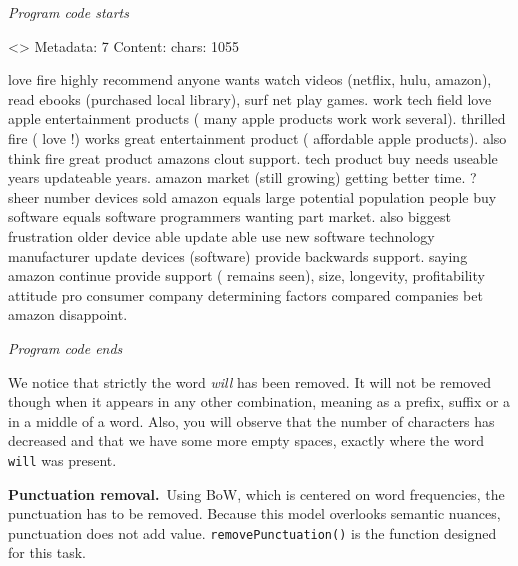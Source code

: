 \emph{Program code starts}

\begin{Shaded}
\begin{Highlighting}[]
\OtherTok{\textless{}{-}} \NormalTok{(}\NormalTok{))}

\NormalTok{(docs[[}\NormalTok{]])}
\end{Highlighting}
\end{Shaded}

\textless{}\textgreater{} Metadata: 7 Content: chars: 1055

love fire highly recommend anyone wants watch videos (netflix, hulu,
amazon), read ebooks (purchased local library), surf net play games.
work tech field love apple entertainment products ( many apple products
work work several). thrilled fire ( love !) works great entertainment
product ( affordable apple products). also think fire great product
amazons clout support. tech product buy needs useable years updateable
years. amazon market (still growing) getting better time. ? sheer number
devices sold amazon equals large potential population people buy
software equals software programmers wanting part market. also biggest
frustration older device able update able use new software technology
manufacturer update devices (software) provide backwards support. saying
amazon continue provide support ( remains seen), size, longevity,
profitability attitude pro consumer company determining factors compared
companies bet amazon disappoint.

\emph{Program code ends}

We notice that strictly the word \emph{will} has been removed. It will
not be removed though when it appears in any other combination, meaning
as a prefix, suffix or a in a middle of a word. Also, you will observe
that the number of characters has decreased and that we have some more
empty spaces, exactly where the word \texttt{will} was present.

\textbf{Punctuation removal.}~Using BoW, which is centered on
word frequencies, the punctuation has to be removed. Because this model
overlooks semantic nuances, punctuation does not add value.
\texttt{removePunctuation()} is the function designed for this task.

